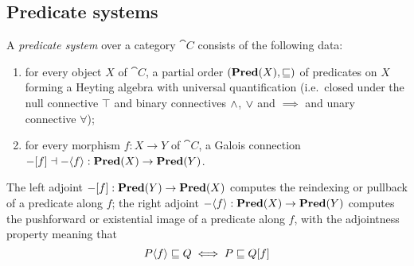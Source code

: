 \subsection{Predicate systems}
\label{sec:predicate-system}

A \emph{predicate system} over a category $\cat{C}$ consists of the following data:
\begin{enumerate}
\item for every object $X$ of $\cat{C}$, a partial order $(\mathbf{Pred}(X), \sqsubseteq)$ of predicates on $X$
forming a Heyting algebra with universal quantification (i.e.~closed under the null connective $\top$ and
binary connectives $\wedge$, $\vee$ and $\implies$ and unary connective $\forall$);
\item for every morphism $f: X \to Y$ of $\cat{C}$, a Galois connection $-[f] \dashv -\langle f\rangle : \mathbf{Pred}(X) \to \mathbf{Pred}(Y)$.
\end{enumerate}
\noindent The left adjoint $-[f]: \mathbf{Pred}(Y) \to \mathbf{Pred}(X)$ computes the reindexing or pullback of a
predicate along $f$; the right adjoint $-\langle f\rangle: \mathbf{Pred}(X) \to \mathbf{Pred}(Y)$ computes the pushforward or
existential image of a predicate along $f$, with the adjointness property meaning that
\[P\langle f\rangle \sqsubseteq Q \iff P \sqsubseteq Q[f] \]

